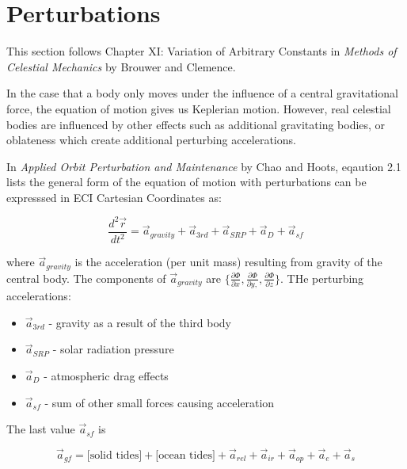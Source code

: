 \documentclass{article}
\begin{document}
\section{Perturbations}

This section follows Chapter XI: Variation of Arbitrary Constants in \textit{Methods of Celestial Mechanics} by Brouwer and Clemence.

In the case that a body only moves under the influence of a central gravitational force, the equation of motion gives us Keplerian motion. However, real celestial bodies are influenced by other effects such as additional gravitating bodies, or oblateness which create additional perturbing accelerations.

In \textit{Applied Orbit Perturbation and Maintenance} by Chao and Hoots, eqaution 2.1 lists the general form of the equation of motion with perturbations can be expresssed in ECI Cartesian Coordinates as:

\begin{equation}
    \frac{d^2 \vec{r}}{dt^2} = \vec{a}_{gravity} +  \vec{a}_{3rd} +  \vec{a}_{SRP} +  \vec{a}_{D} +  \vec{a}_{sf}
\end{equation}

where $\vec{a}_{gravity}$ is the acceleration (per unit mass) resulting from gravity of the central body. The components of $ \vec{a}_{gravity} $ are $\{\frac{\partial \Phi}{\partial x}, \frac{\partial \Phi}{\partial y, }, \frac{\partial \Phi}{\partial z}\}$. THe perturbing accelerations:

\begin{itemize}
    \item $\vec{a}_{3rd}$ - gravity as a result of the third body\\
    \item  $\vec{a}_{SRP}$ - solar radiation pressure \\
    \item  $\vec{a}_{D}$  - atmospheric drag effects \\
    \item $\vec{a}_{sf}$ - sum of other small forces causing acceleration
\end{itemize}

The last value $\vec{a}_{sf}$ is 

\begin{equation}
\vec{a}_{gf} = \text{[solid tides]} + \text{[ocean tides]} + \vec{a}_{rel} + \vec{a}_{ir} + \vec{a}_{op} + \vec{a}_e + \vec{a}_s
\end{equation}
\end{document}

